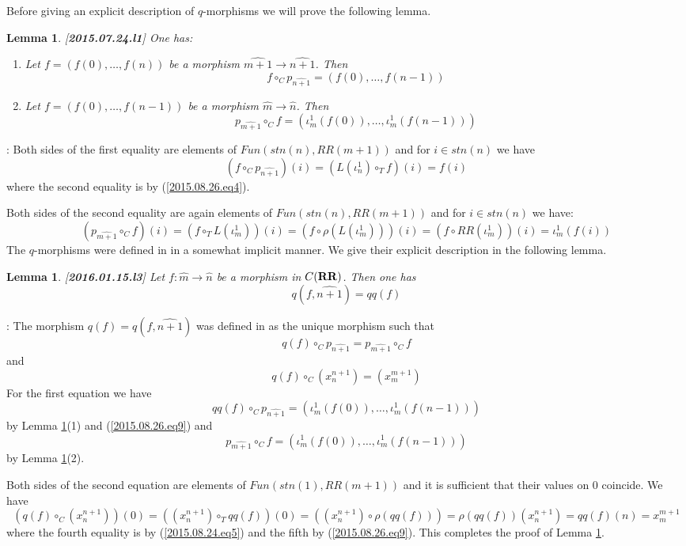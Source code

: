 \documentclass[11pt]{article}
\newenvironment{proof}{{\bf Proof}:}{\vskip 5mm }
\newtheorem{lemma}[proposition]{Lemma}
\newcommand{\llabel}[1]{\label{#1}[{\bf #1}]}
\newcommand{\sr}{\rightarrow}
\newcommand{\wh}{\widehat}
\newcommand{\mbind}{\rho}
\newcommand{\RR}{{\bf RR}}
\begin{document}
Before giving an explicit description of $q$-morphisms we will prove the following lemma.
%
\begin{lemma}
\llabel{2015.07.24.l1}
One has:
%
\begin{enumerate}
\item Let $f=(f(0),\dots,f(n))$ be a morphism $\wh{m+1}\sr\wh{n+1}$. Then 
%
$$f\circ_C p_{\wh{n+1}}=(f(0),\dots,f(n-1))$$
%
\item Let $f=(f(0),\dots,f(n-1))$ be a morphism $\wh{m}\sr \wh{n}$. Then 
%
$$p_{\wh{m+1}}\circ_C f=(\iota_m^1(f(0)),\dots,\iota_m^1(f(n-1)))$$
%
\end{enumerate}
\end{lemma}
%
\begin{proof}
Both sides of the first equality are elements of $Fun(stn(n), RR(m+1))$ and for $i\in stn(n)$ we have
%
$$(f\circ_C p_{\wh{n+1}})(i)=(L(\iota_{n}^1)\circ_T f)(i)=f(i)$$
%
where the second equality is by (\ref{2015.08.26.eq4}). 

Both sides of the second equality are again elements of $Fun(stn(n), RR(m+1))$ and for $i\in stn(n)$ we have:  
%
$$(p_{\wh{m+1}}\circ_C f)(i)=(f\circ_T L(\iota_{m}^1))(i)=(f\circ \mbind(L(\iota_{m}^1)))(i)=(f\circ RR(\iota_{m}^1))(i)=\iota_{m}^1(f(i))$$
%
\end{proof}
%
The $q$-morphisms were defined in \cite{LandC} in a somewhat implicit manner. We give their explicit description in the following lemma.
%
\begin{lemma}
\llabel{2016.01.15.l3}
Let $f:\wh{m}\sr \wh{n}$ be a morphism in $C(\RR)$. Then one has
%
$$q(f,\wh{n+1})=qq(f)$$
%
\end{lemma}
%
\begin{proof}
The morphism $q(f)=q(f,\wh{n+1})$ was defined in \cite{LandC} as the unique morphism such that
%
$$q(f)\circ_C p_{\wh{n+1}}=p_{\wh{m+1}}\circ_C f$$
%
and
%
$$q(f)\circ_C (x_n^{n+1})=(x_m^{m+1})$$
%
For the first equation we have
%
$$qq(f)\circ_C p_{\wh{n+1}}=(\iota_m^1(f(0)),\dots,\iota_m^1(f(n-1)))$$
%
by Lemma \ref{2015.07.24.l1}(1) and (\ref{2015.08.26.eq9}) and
%
$$p_{\wh{m+1}}\circ_C f = (\iota_m^1(f(0)),\dots,\iota_m^1(f(n-1)))$$
%
by Lemma \ref{2015.07.24.l1}(2).

Both sides of the second equation are elements of $Fun(stn(1),RR(m+1))$ and it is sufficient that their values on $0$ coincide. We have 
%
$$(q(f)\circ_C (x_n^{n+1}))(0)=((x_n^{n+1})\circ_T qq(f))(0)=((x_n^{n+1})\circ \mbind(qq(f)))=\mbind(qq(f))(x_n^{n+1})=qq(f)(n)=x_m^{m+1}$$
%
where the fourth equality is by (\ref{2015.08.24.eq5}) and the fifth by (\ref{2015.08.26.eq9}). This completes the proof of Lemma \ref{2016.01.15.l3}.
\end{proof}
\end{document}
